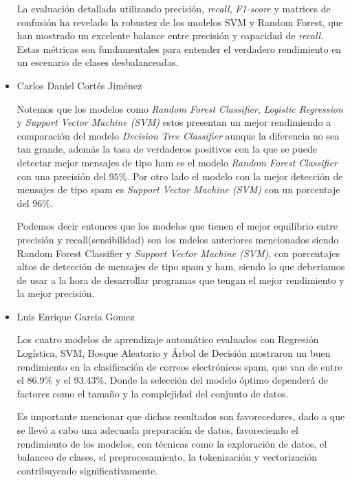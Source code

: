 \begin{itemize}
    La evaluación detallada utilizando precisión, \textit{recall}, \textit{F1-score} y matrices de confusión ha revelado la robustez de los modelos SVM y 
    Random Forest, que han mostrado un excelente balance entre precisión y capacidad de \textit{recall}. Estas métricas son fundamentales para 
    entender el verdadero rendimiento en un escenario de clases desbalanceadas.

    \item Carlos Daniel Cortés Jiménez

    Notemos que los modelos como \textit{Random Forest Classifier}, \textit{Logistic Regression} y \textit{Support Vector Machine (SVM)} estos 
    presentan un mejor rendimiendo a comparación del modelo \textit{Decision Tree Classifier} aunque la diferencia no sea tan grande, además 
    la tasa de verdaderos positivos con la que se puede detectar mejor mensajes de tipo ham es el modelo \textit{Random Forest Classifier} con 
    una precisión del $95\%$. Por otro lado el modelo con la mejor detección de mensajes de tipo spam es \textit{Support Vector Machine (SVM)} 
    con un porcentaje del $96\%$.

    Podemos decir entonces que los modelos que tienen el mejor equilibrio entre precisión y recall(sensibilidad) son los mdelos anteriores 
    mencionados siendo Random Forest Classifier y \textit{Support Vector Machine (SVM)}, con porcentajes altos de detección de mensajes 
    de tipo spam y ham, siendo lo que deberiamos de usar a la hora de desarrollar programas que tengan el mejor rendimiento y la mejor precisión.

    \item Luis Enrique Garcia Gomez
    
    Los cuatro modelos de aprendizaje automático evaluados con Regresión Logística, SVM, Bosque Aleatorio y Árbol de Decisión mostraron un buen rendimiento en la clasificación de correos electrónicos spam, que van de entre el 86.9\% y el 93.43\%. Donde la selección del modelo óptimo dependerá de factores como el tamaño y la complejidad del conjunto de datos.


Es importante mencionar que dichos resultados son favorecedores, dado a que se llevó a cabo una adecuada preparación de datos, favoreciendo el rendimiento de los modelos, con técnicas como la exploración de datos, el balanceo de clases, el preprocesamiento, la tokenización y vectorización contribuyendo significativamente.



\end{itemize}
